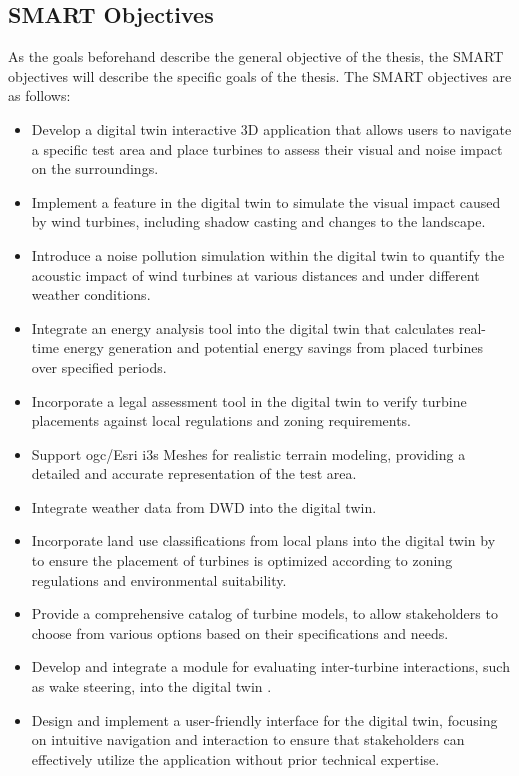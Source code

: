 \documentclass[11pt, titlepage, a4paper]{scrartcl}
\begin{document}
\begin{linenumbers}
    \subsection{SMART Objectives}
    As the goals beforehand describe the general objective of the thesis, the SMART objectives will describe the specific goals of the thesis. The SMART objectives are as follows:
    \begin{itemize}[label={--}]
        \item Develop a digital twin interactive 3D application  that allows users to navigate a specific test area and place turbines to assess their visual and noise impact on the surroundings.
        \item Implement a feature  in the digital twin to simulate the visual impact caused by wind turbines, including shadow casting and changes to the landscape.
        \item Introduce a noise pollution simulation within the digital twin to quantify the acoustic impact of wind turbines at various distances and under different weather conditions.
        \item Integrate an energy analysis tool into the digital twin  that calculates real-time energy generation and potential energy savings from placed turbines over specified periods.
        \item Incorporate a legal assessment tool  in the digital twin to verify turbine placements against local regulations and zoning requirements.
        \item Support \gls{ogc}/Esri \gls{i3s} Meshes for realistic terrain modeling, providing a detailed and accurate representation of the test area.
        \item Integrate weather data from DWD into the digital twin.
        \item Incorporate land use classifications from local plans into the digital twin by to ensure the placement of turbines is optimized according to zoning regulations and environmental suitability.
        \item Provide a comprehensive catalog of turbine models, to allow stakeholders to choose from various options based on their specifications and needs.
        \item Develop and integrate a module for evaluating inter-turbine interactions, such as wake steering, into the digital twin \cite{howlandWindFarmPower2019a}.
        \item  Design and implement a user-friendly interface for the digital twin, focusing on intuitive navigation and interaction to ensure that stakeholders can effectively utilize the application without prior technical expertise.

\end{itemize}
\end{linenumbers}
\end{document}
